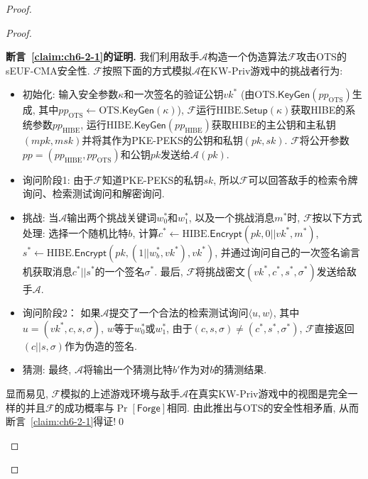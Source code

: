 \begin{proof}
\begin{proof}
\begin{trivlist}
	\item \textbf{断言~\ref{claim:ch6-2-1}的证明.} 我们利用敌手$\mathcal{A}$构造一个伪造算法$\mathcal{F}$攻击OTS的sEUF-CMA安全性. 	$\mathcal{F}$按照下面的方式模拟$\mathcal{A}$在KW-Priv游戏中的挑战者行为: 
\begin{itemize}
\item 初始化: 输入安全参数$\kappa$和一次签名的验证公钥$vk^*$ (由$\text{OTS}.\mathsf{KeyGen}(pp_{\text{OTS}})$生成, 其中$pp_{\text{OTS}} \leftarrow \text{OTS}.\mathsf{KeyGen}(\kappa)$), 
		$\mathcal{F}$运行$\text{HIBE}.\mathsf{Setup}(\kappa)$获取HIBE的系统参数$pp_{\text{HIBE}}$, 运行$\text{HIBE}.\mathsf{KeyGen}(pp_{\text{HIBE}})$获取HIBE的主公钥和主私钥$(mpk, msk)$并将其作为PKE-PEKS的公钥和私钥$(pk, sk)$. $\mathcal{F}$将公开参数$pp = (pp_{\text{HIBE}}, pp_{\text{OTS}})$和公钥$pk$发送给$\mathcal{A}(pk)$. 

\item 询问阶段1: 由于$\mathcal{F}$知道PKE-PEKS的私钥$sk$, 所以$\mathcal{F}$可以回答敌手的检索令牌询问、检索测试询问和解密询问. 

\item 挑战: 当$\mathcal{A}$输出两个挑战关键词$w_0^*$和$w_1^*$, 以及一个挑战消息$m^*$时, $\mathcal{F}$按以下方式处理: 选择一个随机比特$b$, 计算$c^* \leftarrow \text{HIBE}.\mathsf{Encrypt}(pk, 0||vk^*, m^*)$, 
$s^* \leftarrow \text{HIBE}.\mathsf{Encrypt}(pk, (1||w_b^*, vk^*), vk^*)$, 并通过询问自己的一次签名谕言机获取消息$c^*||s^*$的一个签名$\sigma^*$. 最后, $\mathcal{F}$将挑战密文$(vk^*, c^*, s^*, \sigma^*)$发送给敌手$\mathcal{A}$. 

\item 询问阶段2： 如果$\mathcal{A}$提交了一个合法的检索测试询问$\langle u, w \rangle$, 其中$u = (vk^*, c, s, \sigma)$, $w$等于$w_0^*$或$w_1^*$, 由于$(c, s, \sigma) \neq (c^*, s^*, \sigma^*)$,  $\mathcal{F}$直接返回$(c||s, \sigma)$作为伪造的签名.

\item 猜测: 最终, $\mathcal{A}$将输出一个猜测比特$b'$作为对$b$的猜测结果.
\end{itemize}

显而易见, $\mathcal{F}$模拟的上述游戏环境与敌手$\mathcal{A}$在真实KW-Priv游戏中的视图是完全一样的并且$\mathcal{F}$的成功概率与$\Pr[\mathsf{Forge}]$相同. 由此推出与OTS的安全性相矛盾, 从而断言~\ref{claim:ch6-2-1}得证!\qed 
 

\end{trivlist}
\end{proof}
\end{proof}
